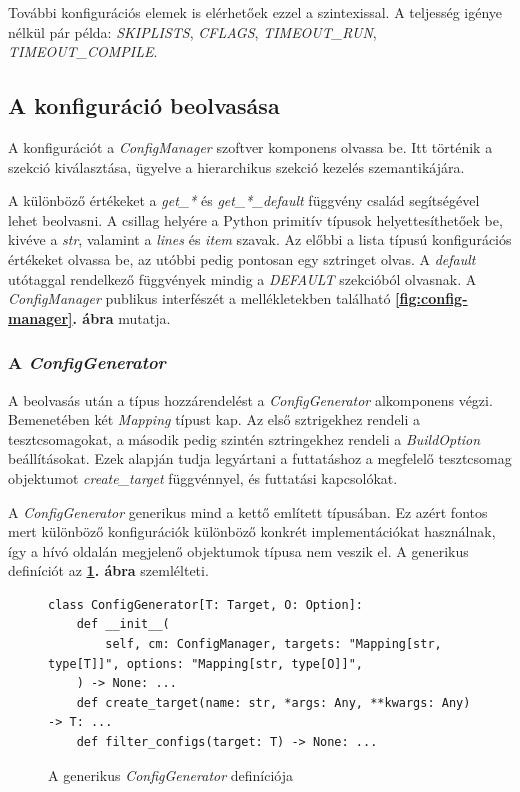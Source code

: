             \noindent
            További konfigurációs elemek is elérhetőek ezzel a szintexissal. A teljesség igénye nélkül pár példa:
            \textit{SKIPLISTS}, \textit{CFLAGS}, \textit{TIMEOUT\_RUN}, \textit{TIMEOUT\_COMPILE}.

    \subsection{A konfiguráció beolvasása}

        A konfigurációt a \textit{ConfigManager} szoftver komponens olvassa be. Itt történik a szekció kiválasztása,
        ügyelve a hierarchikus szekció kezelés szemantikájára.

        A különböző értékeket a \textit{get\_*} és \textit{get\_*\_default} függvény család segítségével lehet
        beolvasni. A csillag helyére a Python primitív típusok helyettesíthetőek be, kivéve a \textit{str}, valamint a
        \textit{lines} és \textit{item} szavak. Az előbbi a lista típusú konfigurációs értékeket olvassa be, az utóbbi
        pedig pontosan egy sztringet olvas. A \textit{default} utótaggal rendelkező függvények mindig a
        \textit{DEFAULT} szekcióból olvasnak. A \textit{ConfigManager} publikus interfészét a mellékletekben található
        \textbf{\ref{fig:config-manager}. ábra} mutatja.

        \subsubsection{A \textit{ConfigGenerator}}

            A beolvasás után a típus hozzárendelést a \textit{ConfigGenerator} alkomponens végzi. Bemenetében két
            \textit{Mapping} típust kap. Az első sztrigekhez rendeli a tesztcsomagokat, a második pedig szintén
            sztringekhez rendeli a \textit{BuildOption} beállításokat. Ezek alapján tudja legyártani a futtatáshoz a
            megfelelő tesztcsomag objektumot \textit{create\_target} függvénnyel, és futtatási kapcsolókat.

            A \textit{ConfigGenerator} generikus mind a kettő említett típusában. Ez azért fontos mert különböző
            konfigurációk különböző konkrét implementációkat használnak, így a hívó oldalán megjelenő objektumok típusa
            nem veszik el. A generikus definíciót az \textbf{\ref{fig:config-generator}. ábra} szemlélteti.

            \begin{figure}[ht]
                \centering
                \begin{verbatim}
class ConfigGenerator[T: Target, O: Option]:
    def __init__(
        self, cm: ConfigManager, targets: "Mapping[str, type[T]]", options: "Mapping[str, type[O]]",
    ) -> None: ...
    def create_target(name: str, *args: Any, **kwargs: Any) -> T: ...
    def filter_configs(target: T) -> None: ...
            \end{verbatim}
                \caption{\label{fig:config-generator} A generikus \textit{ConfigGenerator} definíciója}
            \end{figure}

